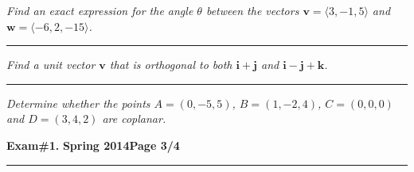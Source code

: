 \documentclass[12pt]{article}
\begin{document}
{\problem[10 pts] \em Find an exact expression for the angle $\theta$ between
the vectors $\boldsymbol{v}=\langle 3, -1, 5\rangle$ and
$\boldsymbol{w}=\langle -6, 2, -15\rangle$.} 
\vspace{2cm}
\begin{flushright}
\end{flushright}
\hrule

{\problem[15 pts] \em Find a unit vector $\boldsymbol{v}$ that is orthogonal
to both $\boldsymbol{i} + \boldsymbol{j}$ and $\boldsymbol{i} - \boldsymbol{j} +
\boldsymbol{k}$.} 
\vspace{4cm}
\begin{flushright}
\end{flushright}
\hrule

{\problem[15 pts] \em Determine whether the points $A=(0,-5,5)$, $ B=
(1,-2,4)$, $C=(0,0,0)$ and $D=(3,4,2)$ are coplanar.}
\newpage

\hfill{\large\bf Exam\#1.}\hfill{\large\bf
  Spring 2014}\hfill{\large\bf Page 3/4}\hrule
\end{document}
